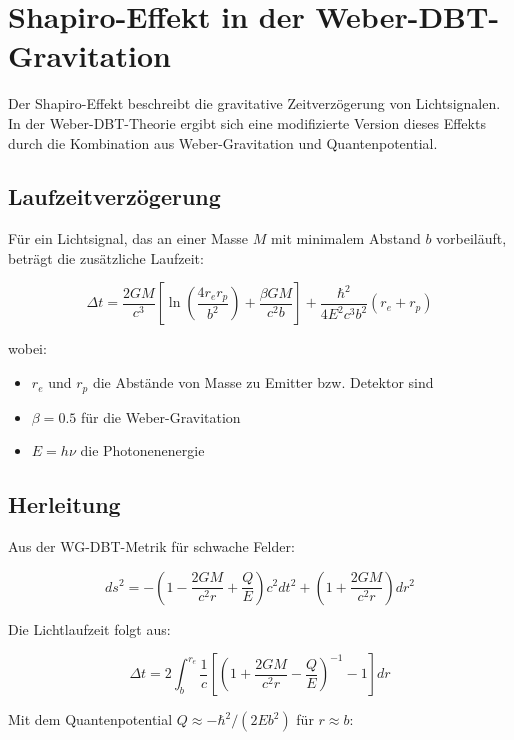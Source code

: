 \section{Shapiro-Effekt in der Weber-DBT-Gravitation}
\label{sec:shapiro_effect}

Der Shapiro-Effekt beschreibt die gravitative Zeitverzögerung von Lichtsignalen. In der Weber-DBT-Theorie ergibt sich eine modifizierte Version dieses Effekts durch die Kombination aus Weber-Gravitation und Quantenpotential.

\subsection{Laufzeitverzögerung}
Für ein Lichtsignal, das an einer Masse $M$ mit minimalem Abstand $b$ vorbeiläuft, beträgt die zusätzliche Laufzeit:

\begin{equation}
\Delta t = \frac{2GM}{c^3}\left[\ln\left(\frac{4r_e r_p}{b^2}\right) + \frac{\beta GM}{c^2b}\right] + \frac{\hbar^2}{4E^2c^3b^2}(r_e + r_p)
\end{equation}

wobei:
\begin{itemize}
\item $r_e$ und $r_p$ die Abstände von Masse zu Emitter bzw. Detektor sind
\item $\beta = 0.5$ für die Weber-Gravitation
\item $E = h\nu$ die Photonenenergie
\end{itemize}

\subsection{Herleitung}
Aus der WG-DBT-Metrik für schwache Felder:

\begin{equation}
ds^2 = -\left(1 - \frac{2GM}{c^2r} + \frac{Q}{E}\right)c^2dt^2 + \left(1 + \frac{2GM}{c^2r}\right)dr^2
\end{equation}

Die Lichtlaufzeit folgt aus:

\begin{equation}
\Delta t = 2\int_{b}^{r_e} \frac{1}{c}\left[\left(1 + \frac{2GM}{c^2r} - \frac{Q}{E}\right)^{-1} - 1\right] dr
\end{equation}

Mit dem Quantenpotential $Q \approx -\hbar^2/(2Eb^2)$ für $r \approx b$:


